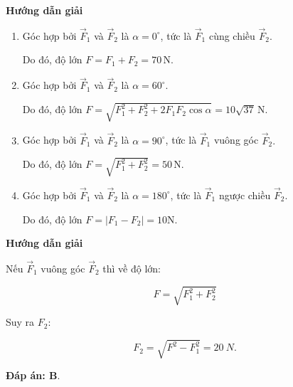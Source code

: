 \setcounter{section}{0}
\setcounter{viduii}{0}
{	\begin{center}
		\textbf{Hướng dẫn giải}
	\end{center}
	
	\begin{enumerate}[label=\alph*.]
		\item Góc hợp bởi $\vec{F}_1$ và $\vec{F}_2$ là $\alpha =0^\circ$, tức là  $\vec{F}_1$ cùng chiều $\vec{F}_2.$
		
		Do đó, độ lớn $F=F_1+F_2= 70\, \si{\newton}$.
		\item Góc hợp bởi $\vec{F}_1$ và $\vec{F}_2$ là $\alpha =60^\circ.$
		
		Do đó, độ lớn $F=\sqrt{F_1^2+F_2^2+2F_1F_2\cos \alpha }= 10\sqrt{37}\,\si{\newton}$.
		\item Góc hợp bởi $\vec{F}_1$ và $\vec{F}_2$ là $\alpha =90^\circ$, tức là  $\vec{F}_1$ vuông góc $\vec{F}_2.$
		
		Do đó, độ lớn $F=\sqrt{F_1^2+F_2^2}=50\, \si{\newton}$.
		\item Góc hợp bởi $\vec{F}_1$ và $\vec{F}_2$ là $\alpha =180^\circ$, tức là  $\vec{F}_1$ ngược chiều $\vec{F}_2.$
		
		Do đó, độ lớn $F=|F_1-F_2|= 10\si{\newton}$.
	\end{enumerate}
	
}
{	\begin{center}
		\textbf{Hướng dẫn giải}
	\end{center}
	
	Nếu $\vec{F}_1$ vuông góc $\vec{F}_2$ thì về độ lớn: 
	
	$$F=\sqrt{F_1^2+F_2^2}$$
	
	Suy ra $F_2$: 
	
	$$F_2 = \sqrt {F^2 - F_1^2} = \SI{20}{N}.$$
	
	\textbf{Đáp án: B}.
}
